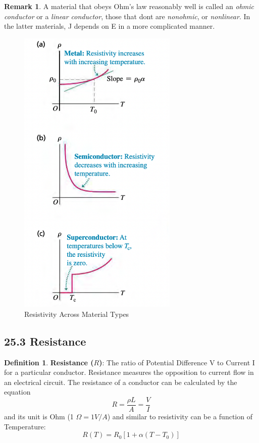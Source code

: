 \documentclass[12pt]{amsart}
\theoremstyle{definition}
\newtheorem{definition}{Definition} %
\newtheorem*{remark}{Remark}        %
\numberwithin{equation}{theorem}    %
\begin{document}
\begin{remark}
    A material that obeys Ohm’s law reasonably well is called an \textit{ohmic 
    conductor} or a \textit{linear conductor}, those that dont are \textit{nonohmic}, 
    or \textit{nonlinear}. In the latter materials, J depends on E in a more complicated manner.
\end{remark}

\begin{figure}[H]
    \centering
    \includegraphics[width=3in,scale=0.25]{Media/Resistivity.png}
    \caption{Resistivity Across Material Types}
    \label{Resistivity Across Material Types}
\end{figure}

\subsection*{25.3 Resistance}

\begin{definition}
    \textbf{Resistance ($R$)}:
    The ratio of Potential Difference V to Current I for a particular conductor.
    Resistance measures the opposition to current flow in an electrical circuit.
    The resistance of a conductor can be calculated by the equation
    $$R = \frac{\rho L}{A} = \frac{V}{I}$$ and its unit is Ohm (1 $\Omega = 1V/A$)
    and similar to resistivity can be a function of Temperature:
    $$R(T) = R_0[1+\alpha(T-T_0)]$$
\end{definition}
\end{document}
